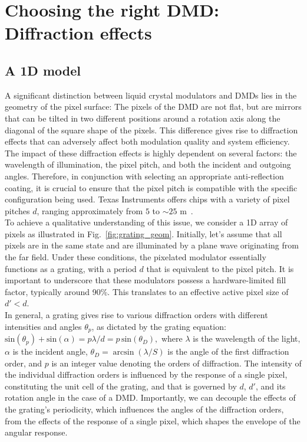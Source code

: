 \documentclass[12pt]{iopart}
\begin{document}
\section{Choosing the right DMD: Diffraction effects}

\subsection{A 1D model}

A significant distinction between liquid crystal modulators and DMDs
lies in the geometry of the pixel surface: 
The pixels of the DMD are not flat, but are mirrors that can be tilted 
in two different positions around a rotation axis
along the diagonal of the square shape of the pixels.
This difference gives rise to diffraction effects that can adversely affect
both modulation quality and system efficiency.
The impact of these diffraction effects is highly dependent on several factors:
the wavelength of illumination, the pixel pitch, and both the incident and outgoing angles.
Therefore, in conjunction with selecting an appropriate anti-reflection coating,
it is crucial to ensure that the pixel pitch is compatible with the specific configuration being used.
Texas Instruments offers chips with a variety of pixel pitches $d$,
ranging approximately from $5$ to $\sim25$ \textmu m~\cite{TI}.\\


To achieve a qualitative understanding of this issue,
we consider a 1D array of pixels as illustrated in Fig.~\ref{fig:grating_geom}.
Initially, let's assume that all pixels are in the same state and are illuminated by a plane wave originating from the far field.
Under these conditions, the pixelated modulator essentially functions as a grating,
with a period $d$ that is equivalent to the pixel pitch.
It is important to underscore that these modulators possess a hardware-limited fill factor,
typically around 90\%.
This translates to an effective active pixel size of $d' < d$.\\

In general, a grating gives rise to various diffraction orders
with different intensities
and angles $\theta_p$, as dictated by the grating equation:
$
 \text{sin}(\theta_p)+ \text{sin}(\alpha) = p\lambda/d = p \, \text{sin}(\theta_D),
$
where $\lambda$ is the wavelength of the light, $\alpha$ is the incident angle, 
$\theta_D = \arcsin \left(\lambda/S\right)$ is the angle of the first diffraction order,
and $p$ is an integer value denoting the orders of diffraction.
The intensity of the individual diffraction orders is influenced by
the response of a single pixel,
constituting the unit cell of the grating,
and that is governed by $d$, $d'$, and its rotation angle in the case of a DMD.
Importantly, we can decouple the effects of the grating's periodicity,
which influences the angles of the diffraction orders,
from the effects of the response of a single pixel,
which shapes the envelope of the angular response.\\
\end{document}
